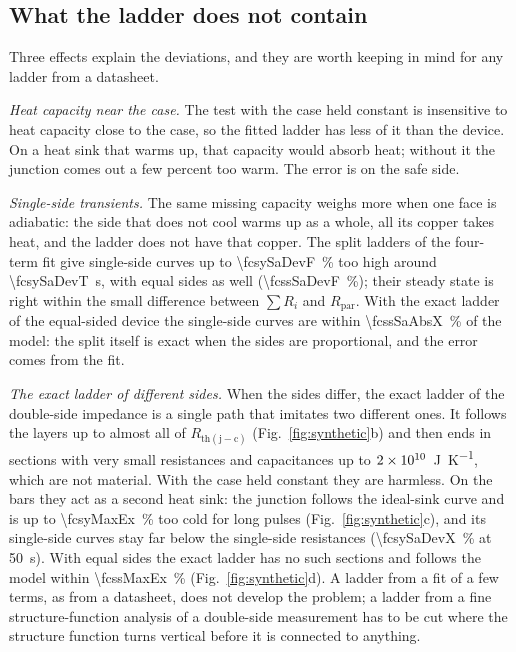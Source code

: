 \documentclass[10pt,a4paper]{scrartcl}
\newcommand{\Rjc}{R_\mathrm{th(j-c)}}
\newcommand{\Rpar}{R_\mathrm{par}}
\newcommand{\JK}{\si{\joule\per\kelvin}}
\begin{document}
\subsection{What the ladder does not contain}
\label{sec:missing}
Three effects explain the deviations, and they are worth keeping in mind for any ladder from a datasheet.

\emph{Heat capacity near the case.} The test with the case held constant is insensitive to heat capacity close to the case, so the fitted ladder has less of it than the device. On a heat sink that warms up, that capacity would absorb heat; without it the junction comes out a few percent too warm. The error is on the safe side.

\emph{Single-side transients.} The same missing capacity weighs more when one face is adiabatic: the side that does not cool warms up as a whole, all its copper takes heat, and the ladder does not have that copper. The split ladders of the four-term fit give single-side curves up to \SI{\fcsySaDevF}{\percent} too high around \SI{\fcsySaDevT}{\second}, with equal sides as well (\SI{\fcssSaDevF}{\percent}); their steady state is right within the small difference between $\sum R_i$ and $\Rpar$. With the exact ladder of the equal-sided device the single-side curves are within \SI{\fcssSaAbsX}{\percent} of the model: the split itself is exact when the sides are proportional, and the error comes from the fit.

\emph{The exact ladder of different sides.} When the sides differ, the exact ladder of the double-side impedance is a single path that imitates two different ones. It follows the layers up to almost all of $\Rjc$ (Fig.~\ref{fig:synthetic}b) and then ends in sections with very small resistances and capacitances up to $2\times 10^{10}$~\JK, which are not material. With the case held constant they are harmless. On the bars they act as a second heat sink: the junction follows the ideal-sink curve and is up to \SI{\fcsyMaxEx}{\percent} too cold for long pulses (Fig.~\ref{fig:synthetic}c), and its single-side curves stay far below the single-side resistances (\SI{\fcsySaDevX}{\percent} at \SI{50}{\second}). With equal sides the exact ladder has no such sections and follows the model within \SI{\fcssMaxEx}{\percent} (Fig.~\ref{fig:synthetic}d). A ladder from a fit of a few terms, as from a datasheet, does not develop the problem; a ladder from a fine structure-function analysis of a double-side measurement has to be cut where the structure function turns vertical before it is connected to anything.
\end{document}
